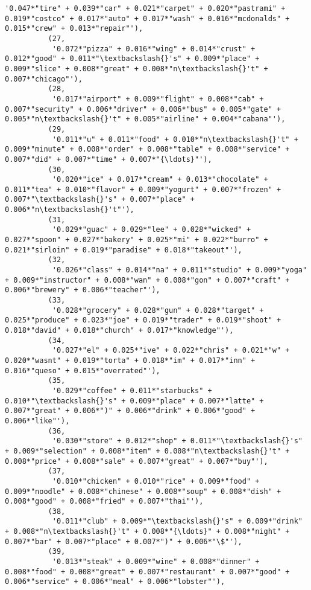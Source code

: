 \documentclass[11pt]{article}
\begin{document}
\begin{Verbatim}[commandchars=\\\{\}]
           '0.047*"tire" + 0.039*"car" + 0.021*"carpet" + 0.020*"pastrami" + 0.019*"costco" + 0.017*"auto" + 0.017*"wash" + 0.016*"mcdonalds" + 0.015*"crew" + 0.013*"repair"'),
          (27,
           '0.072*"pizza" + 0.016*"wing" + 0.014*"crust" + 0.012*"good" + 0.011*"\textbackslash{}'s" + 0.009*"place" + 0.009*"slice" + 0.008*"great" + 0.008*"n\textbackslash{}'t" + 0.007*"chicago"'),
          (28,
           '0.017*"airport" + 0.009*"flight" + 0.008*"cab" + 0.007*"security" + 0.006*"driver" + 0.006*"bus" + 0.005*"gate" + 0.005*"n\textbackslash{}'t" + 0.005*"airline" + 0.004*"cabana"'),
          (29,
           '0.011*"u" + 0.011*"food" + 0.010*"n\textbackslash{}'t" + 0.009*"minute" + 0.008*"order" + 0.008*"table" + 0.008*"service" + 0.007*"did" + 0.007*"time" + 0.007*"{\ldots}"'),
          (30,
           '0.020*"ice" + 0.017*"cream" + 0.013*"chocolate" + 0.011*"tea" + 0.010*"flavor" + 0.009*"yogurt" + 0.007*"frozen" + 0.007*"\textbackslash{}'s" + 0.007*"place" + 0.006*"n\textbackslash{}'t"'),
          (31,
           '0.029*"guac" + 0.029*"lee" + 0.028*"wicked" + 0.027*"spoon" + 0.027*"bakery" + 0.025*"mi" + 0.022*"burro" + 0.021*"sirloin" + 0.019*"paradise" + 0.018*"takeout"'),
          (32,
           '0.026*"class" + 0.014*"na" + 0.011*"studio" + 0.009*"yoga" + 0.009*"instructor" + 0.008*"wan" + 0.008*"gon" + 0.007*"craft" + 0.006*"brewery" + 0.006*"teacher"'),
          (33,
           '0.028*"grocery" + 0.028*"gun" + 0.028*"target" + 0.025*"produce" + 0.023*"joe" + 0.019*"trader" + 0.019*"shoot" + 0.018*"david" + 0.018*"church" + 0.017*"knowledge"'),
          (34,
           '0.027*"el" + 0.025*"ive" + 0.022*"chris" + 0.021*"w" + 0.020*"wasnt" + 0.019*"torta" + 0.018*"im" + 0.017*"inn" + 0.016*"queso" + 0.015*"overrated"'),
          (35,
           '0.029*"coffee" + 0.011*"starbucks" + 0.010*"\textbackslash{}'s" + 0.009*"place" + 0.007*"latte" + 0.007*"great" + 0.006*")" + 0.006*"drink" + 0.006*"good" + 0.006*"like"'),
          (36,
           '0.030*"store" + 0.012*"shop" + 0.011*"\textbackslash{}'s" + 0.009*"selection" + 0.008*"item" + 0.008*"n\textbackslash{}'t" + 0.008*"price" + 0.008*"sale" + 0.007*"great" + 0.007*"buy"'),
          (37,
           '0.010*"chicken" + 0.010*"rice" + 0.009*"food" + 0.009*"noodle" + 0.008*"chinese" + 0.008*"soup" + 0.008*"dish" + 0.008*"good" + 0.008*"fried" + 0.007*"thai"'),
          (38,
           '0.011*"club" + 0.009*"\textbackslash{}'s" + 0.009*"drink" + 0.008*"n\textbackslash{}'t" + 0.008*"{\ldots}" + 0.008*"night" + 0.007*"bar" + 0.007*"place" + 0.007*")" + 0.006*"\$"'),
          (39,
           '0.013*"steak" + 0.009*"wine" + 0.008*"dinner" + 0.008*"food" + 0.008*"great" + 0.007*"restaurant" + 0.007*"good" + 0.006*"service" + 0.006*"meal" + 0.006*"lobster"'),

\end{Verbatim}
\end{document}
